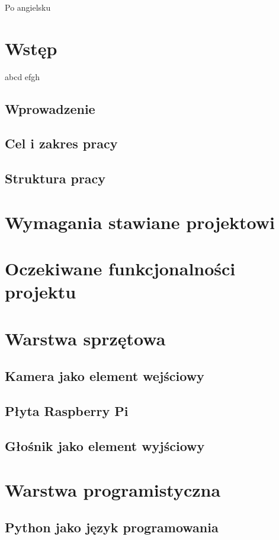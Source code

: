 \documentclass[a4paper,12pt,reqno]{article}
\begin{document}
Po angielsku

\newpage

\section{Wstęp}
abcd efgh
\subsection{Wprowadzenie}
\subsection{Cel i zakres pracy}
\subsection{Struktura pracy}

\newpage
\section{Wymagania stawiane projektowi}

\newpage
\section{Oczekiwane funkcjonalności projektu}

\newpage
\section{Warstwa sprzętowa}
\subsection{Kamera jako element wejściowy}
\subsection{Płyta Raspberry Pi}
\subsection{Głośnik jako element wyjściowy}

\newpage
\section{Warstwa programistyczna}
\subsection{Python jako język programowania}
\end{document}

